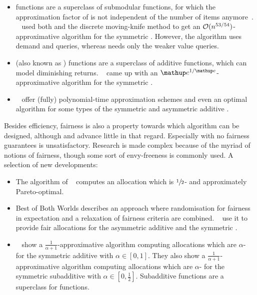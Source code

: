 \begin{itemize}
	\item
	\XOS{} functions are a superclass of submodular functions, for which the approximation factor of \RepReMatch{} is not independent of the number of items anymore~\cite[Section 6.2]{APNSWuSVþUM}.
	~\cite{sublin_approx_algo_for_nsw_with_xos_valuations} used both \RepReMatch{} and the discrete moving-knife method to get an \(\mathcal{O}(n^{53/54})\)-approximative algorithm for the symmetric \XOS{} \NSW.
	However, the algorithm uses demand and \XOS{} queries, whereas \RepReMatch{} needs only the weaker value queries.

	\item
	\CASC{} (also known as \SPLC) functions are a superclass of additive functions, which can model diminishing returns.
	~\cite{fair_division_of_indiv_goods_for_a_class_of_concave_valuations} came up with an \(\euler^{1/\euler}\)-approximative algorithm for the symmetric \CASC{} \NSW.

	\item
	~\cite{tractable_fragments_of_the_max_nsw_problem} offer (fully) polynomial-time approximation schemes and even an optimal algorithm for some types of the symmetric and asymmetric additive \NSW.
\end{itemize}
Besides efficiency, fairness is also a property towards which algorithm can be designed, although \SMatch{} and \RepReMatch{} advance little in that regard.
Especially \RepReMatch{} with no fairness guarantees is unsatisfactory.
Research is made complex because of the myriad of notions of fairness, though some sort of envy-freeness is commonly used.
A selection of new developments:
\begin{itemize}
	\item
	The algorithm of \citeauthor{fair_division_of_indiv_goods_for_a_class_of_concave_valuations}~\cite{fair_division_of_indiv_goods_for_a_class_of_concave_valuations} computes an allocation which is \(\sfrac{1}{2}\)-\EFone{} and approximately Pareto-optimal.

	\item
	Best of Both Worlds describes an approach where randomisation for fairness in expectation and a relaxation of fairness criteria are combined.
	~\cite{bobw_agents_with_entitlements} use it to provide fair allocations for the asymmetric additive \NSW{} and the symmetric \XOS{} \NSW.

	\item
	~\cite{on_optimal_tradeoffs_between_efx_and_nsw} show a \(\frac{1}{\alpha + 1}\)-approximative algorithm computing allocations which are \(\alpha\)-\EFX{} for the symmetric additive \NSW{} with \(\alpha \in [0, 1]\).
	They also show a \(\frac{1}{\alpha+1}\)-approximative algorithm computing allocations which are \(\alpha\)-\EFX{} for the symmetric subadditive \NSW{} with \(\alpha \in [0, \frac{1}{2}]\).
	Subadditive functions are a superclass for \XOS{} functions.
\end{itemize}
